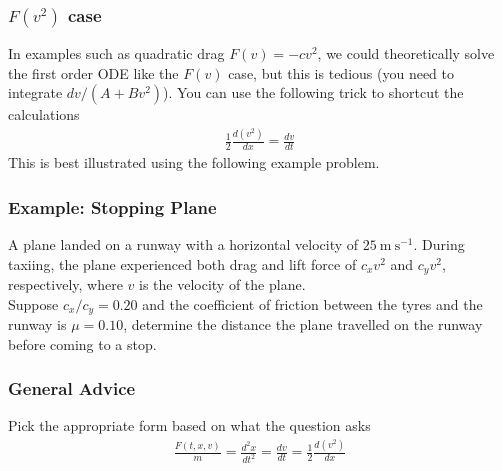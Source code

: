 \documentclass{article}
\begin{document}
\subsubsection{$F(v^2)$ case}
In examples such as quadratic drag $F(v) = -cv^2$, we could theoretically solve the first order ODE like the $F(v)$ case, but this is tedious (you need to integrate $dv/(A+Bv^2)$). You can use the following trick to shortcut the calculations
\begin{align}
    \frac{1}{2} \frac{d(v^2)}{dx} = \frac{dv}{dt}
\end{align}
This is best illustrated using the following example problem.
\subsubsection{Example: Stopping Plane}
A plane landed on a runway with a horizontal velocity of $25 \mathrm{~m} \mathrm{~s}^{-1}$. During taxiing, the plane experienced both drag and lift force of $c_x v^2$ and $c_y v^2$, respectively, where $v$ is the velocity of the plane.\\[10pt]
Suppose $c_x / c_y=0.20$ and the coefficient of friction between the tyres and the runway is $\mu=0.10$, determine the distance the plane travelled on the runway before coming to a stop.
\subsubsection{General Advice}
Pick the appropriate form based on what the question asks
\begin{align}
    \frac{F(t,x,v)}{m} = \frac{d^2x }{dt^2} = \frac{dv}{dt} = \frac{1}{2} \frac{d(v^2)}{dx} 
\end{align}
\end{document}
